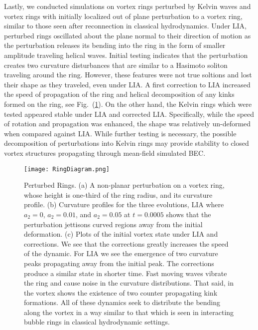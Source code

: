 \documentclass[aps,graphicx,reprint,onecolumn,12pt,tightenlines,longbibliography]{revtex4-1}
\newcommand{\sas}[2]{{#2}}
\begin{document}
{Lastly, we conducted simulations on vortex rings perturbed by Kelvin waves and vortex rings with initially localized \sas{bumps}{out of plane perturbation to a vortex ring}, similar to those seen after reconnection in classical hydrodynamics. Under LIA, \sas{rings with bumps}{perturbed rings} oscillated about the plane normal to their direction of motion as the \sas{bump}{perturbation} release\sas{d}{s} its bending into the ring in the form of \sas{wavy perturbations}{smaller amplitude traveling helical waves.} \sas{of the ring structure.}{} Initial testing indicates that \sas{a bump will}{the perturbation} create\sas{}{s} two curvature disturbances that are similar to a Hasimoto soliton traveling around the ring. However, these features were not true soltions and lost their shape as they traveled, even under LIA. A first correction to LIA increased the speed of propagation of the ring and helical decomposition of any kinks formed on the ring, see Fig.~(\ref{fig:ringDiagram}). On the other hand, the Kelvin rings which were tested appeared stable under LIA and corrected LIA. Specifically, while the speed of rotation and propagation was enhanced, the shape was relatively un-deformed when compared against LIA. While further testing is necessary, the possible decomposition of \sas{bumps}{perturbations} into Kelvin rings may provide stability to closed vortex structures propagating through mean-field simulated BEC.   
%
\begin{figure}[h]
\texttt{[image: RingDiagram.png]}
\caption{Perturbed Rings. (a) A \sas{bump}{non-planar perturbation} on a vortex \sas{}{ring}, whose height is one-third of the ring radius, and its curvature profile. (b) Curvature profiles for the three evolutions, LIA where $a_{2}=0$, $a_{2}=0.01$, and $a_{2}=0.05$ at $t=0.0005$ shows that the \sas{bump}{perturbation} jettisons curved regions away from the initial deformation.   (c) Plots of the initial vortex state under LIA and corrections. We see that the corrections greatly increases the speed of the dynamic. For LIA we see the emergence of two curvature peaks propagating \sas{of}{away from} the initial peak. The corrections produce a similar state in shorter time. Fast moving waves vibrate the ring and cause noise in the curvature distributions. That said, in the vortex shows the existence of two counter propagating kink formations. All of these dynamics seek to distribute the bending along the vortex in a way similar to that which is seen in interacting bubble rings in classical hydrodynamic settings.}
\label{fig:ringDiagram}
\end{figure}
%

}
\end{document}

